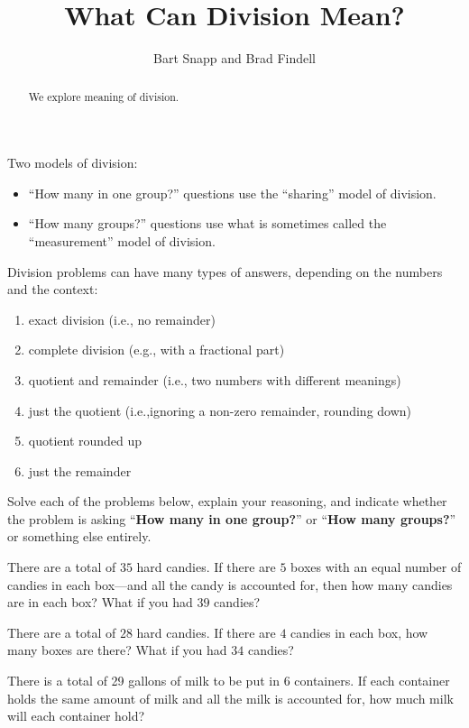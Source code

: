\documentclass[nooutcomes]{ximera}
\title{What Can Division Mean?}
\author{Bart Snapp and Brad Findell}
\begin{document}
\begin{abstract}
We explore meaning of division.
\end{abstract}
\maketitle

\label{A:dm}
\begin{teachingnote}
Two models of division:  
\begin{itemize}
\item ``How many in one group?'' questions use the ``sharing'' model of division.  
\item ``How many groups?'' questions use what is sometimes called the ``measurement'' model of division.  
\end{itemize}
Division problems can have many types of answers, depending on the numbers and the context:
\begin{enumerate}
\item exact division (i.e., no remainder)
\item complete division (e.g., with a fractional part)
\item quotient and remainder (i.e., two numbers with different meanings)
\item just the quotient (i.e.,ignoring a non-zero remainder, rounding down)
\item quotient rounded up 
\item just the remainder
\end{enumerate}
\end{teachingnote}
Solve each of the problems below, explain your reasoning, and indicate whether the problem is asking ``\textbf{How many in one group?}'' or ``\textbf{How many groups?}'' or something else entirely.

\begin{problem}
There are a total of $35$ hard candies. If there are $5$ boxes with an
equal number of candies in each box---and all the candy is accounted
for, then how many candies are in each box? What if you had $39$
candies?
\end{problem}

\begin{problem}
There are a total of $28$ hard candies. If there are $4$ candies in
each box, how many boxes are there? What if you had $34$ candies?
\end{problem}


\begin{problem}
There is a total of 29 gallons of milk to be put in 6 containers.  If
each container holds the same amount of milk and all the milk is
accounted for, how much milk will each container hold?
\end{problem}
\end{document}
